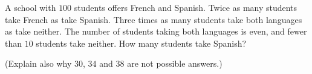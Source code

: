 A school with $100$ students offers French and Spanish. Twice as many students take French as take Spanish. Three times as many students take both languages as take neither. The number of students taking both languages is even, and fewer than $10$ students take neither. How many students take Spanish?

(Explain also why $30$, $34$ and $38$ are not possible answers.)
